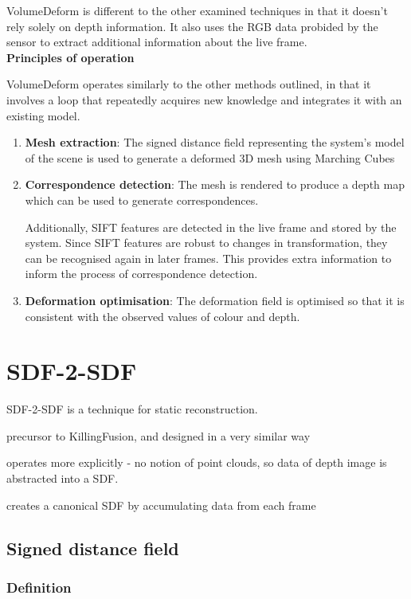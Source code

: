 \documentclass[12pt,twoside]{report}
\begin{document}
VolumeDeform is different to the other examined techniques in that it doesn't rely solely on depth information. It also uses the RGB data probided by the sensor to extract additional information about the live frame.\\


\noindent\textbf{Principles of operation}

VolumeDeform operates similarly to the other methods outlined, in that it involves a loop that repeatedly acquires new knowledge and integrates it with an existing model.

\begin{enumerate}
\item \textbf{Mesh extraction}: The signed distance field representing the system's model of the scene is used to generate a deformed 3D mesh using Marching Cubes
\item \textbf{Correspondence detection}: The mesh is rendered to produce a depth map which can be used to generate correspondences.

Additionally, SIFT features are detected in the live frame and stored by the system. Since SIFT features are robust to changes in transformation, they can be recognised again in later frames. This provides extra information to inform the process of correspondence detection.

\item \textbf{Deformation optimisation}: The deformation field is optimised so that it is consistent with the observed values of colour and depth.
\end{enumerate}


\section{SDF-2-SDF}

SDF-2-SDF is a technique for static reconstruction.

precursor to KillingFusion, and designed in a very similar way

operates more explicitly - no notion of point clouds, so data of depth image is abstracted into a SDF. 

creates a canonical SDF by accumulating data from each frame

\subsection{Signed distance field}

\subsubsection{Definition}
\end{document}
